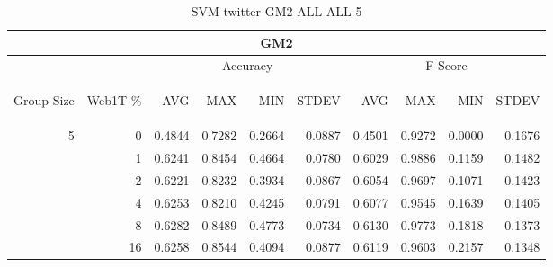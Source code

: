 \begin{center}
\begin{table}[htbp] 
 \begin{center}
\begin{tabular}{ | r | r | r | r | r | r | r | r | r | r |}
\hline
\multicolumn{10}{|c|}{GM2}\\
\hline
 & & \multicolumn{4}{|c|}{Accuracy} & \multicolumn{4}{|c|}{F-Score}\\ \cline{3-10}
\begin{sideways}Group Size\end{sideways} & \begin{sideways}Web1T \%\end{sideways} & \begin{sideways}AVG\end{sideways} & \begin{sideways}MAX\end{sideways} & \begin{sideways}MIN\end{sideways} & \begin{sideways}STDEV\end{sideways} & \begin{sideways}AVG\end{sideways} & \begin{sideways}MAX\end{sideways} & \begin{sideways}MIN\end{sideways} & \begin{sideways}STDEV\end{sideways}\\
\hline
\multirow{5}{*}{5}
 & 0 & 0.4844 & 0.7282 & 0.2664 & 0.0887 & 0.4501 & 0.9272 & 0.0000 & 0.1676\\ \cline{2-10}
 & 1 & 0.6241 & 0.8454 & 0.4664 & 0.0780 & 0.6029 & 0.9886 & 0.1159 & 0.1482\\ \cline{2-10}
 & 2 & 0.6221 & 0.8232 & 0.3934 & 0.0867 & 0.6054 & 0.9697 & 0.1071 & 0.1423\\ \cline{2-10}
 & 4 & 0.6253 & 0.8210 & 0.4245 & 0.0791 & 0.6077 & 0.9545 & 0.1639 & 0.1405\\ \cline{2-10}
 & 8 & 0.6282 & 0.8489 & 0.4773 & 0.0734 & 0.6130 & 0.9773 & 0.1818 & 0.1373\\ \cline{2-10}
 & 16 & 0.6258 & 0.8544 & 0.4094 & 0.0877 & 0.6119 & 0.9603 & 0.2157 & 0.1348\\ \cline{2-10}
\hline
\end{tabular}
\caption{SVM-twitter-GM2-ALL-ALL-5}
\label{table:SVM-twitter-GM2-ALL-ALL-5}
\end{center}
 \end{table}
\end{center}

